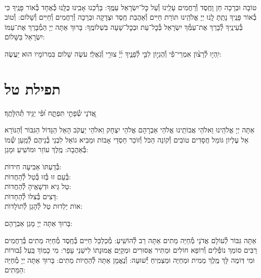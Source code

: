 \documentclass[twoside, openany, parskip=half, 11pt]{book}
\begin{document}
\shatz\\
טוֹבָה וּבְרָכָה חֵן וָחֶֽסֶד וְ֯רַחֲמִים עָלֵֽינוּ וְ֯עַל כׇּל־יִשְׂרָאֵל עַמֶּֽךָ: בָּרְ֯כֵנוּ אָבִֽינוּ כֻּלָּֽנוּ כְּ֯אֶחָד בְּ֯אוֹר פָּנֶֽיךָ כִּי בְ֯אוֹר פָּנֶֽיךָ נָתַֽתָּ לָֽנוּ יְיָ אֱלֹהֵֽינוּ תּוֹרַת חַיִּים וְ֯אַהֲבַת חֶֽסֶד וּצְדָקָה וּבְרָכָה וְ֯רַחֲמִים וְ֯חַיִּים וְ֯שָׁלוֹם: וְ֯טוֹב בְּ֯עֵינֶֽיךָ לְ֯בָרֵךְ אֶת־עַמְּ֯ךָ יִשְׂרָאֵל בְּ֯כׇל־עֵת וּבְכׇל־שָׁעָה בִּשְׁלוֹמֶֽךָ: בָּרוּךְ אַתָּה יְיָ הַמְ֯בָרֵךְ אֶת־עַמּוֹ יִשְׂרָאֵל בַּשָּׁלוֹם:

יִֽהְי֥וּ לְ֯רָצ֨וֹן אִמְרֵי־פִ֡י וְ֯הֶגְי֣וֹן לִבִּ֣י לְ֯פָנֶ֑יךָ יְ֜יָ֗ צוּרִ֥י וְ֯גֹֽאֲלִֽי׃ עֹשֶׂה שָׁלוֹם בִּמְרוֹמָיו הוּא יַעֲשֶׂה:

\vfill

\section[תפילת טל]{ תפילת טל }
\label{tefilastal}


\begin{small}
אֲ֭דֹנָי שְׂ֯פָתַ֣י תִּפְתָּ֑ח וּ֝פִ֗י יַגִּ֥יד תְּ֯הִלָּתֶֽךָ׃
\\
\end{small}
אַתָּה יְיָ אֱלֹהֵֽינוּ וֵאלֹהֵי אֲבוֹתֵֽינוּ אֱלֹהֵי אַבְרָהָם אֱלֹהֵי יִצְחָק וֵאלֹהֵי יַעֲקֹב הָאֵל הַגָּדוֹל הַגִּבּוֹר וְ֯הַנּוֹרָא אֵל עֶלְיוֹן גּוֹמֵל חֲסָדִים טוֹבִים וְ֯קוֹנֵה הַכֹּל וְ֯זוֹכֵר חַסְדֵי אָבוֹת וּמֵבִיא גוֹאֵל לִבְנֵי בְ֯נֵיהֶם לְ֯מַֽעַן שְׁ֯מוֹ בְּ֯אַהֲבָה: מֶֽלֶךְ עוֹזֵר וּמוֹשִֽׁיעַ וּמָגֵן:


\begin{large}
בְּ֯דַעְתּוׂ אַבִּיעָה חִידוׂת: \\
בְּ֯עַם זוּ בְּ֯זוּ בְּ֯טַל לְ֯הַחֲדוׂת:\\
טַל גֵּיא וּדְשָׁאֶֽיהָ לְ֯הַחֲדוׂת: \\
דָּצִים בְּ֯צִלּוׂ לְ֯הֵחָדוׂת:\\
אוׂת יַלְדוּת טַל לְ֯הָגֵן לְ֯תוׂלָדוׂת:

\end{large}


בָּרוּךְ אַתָּה יְיָ מָגֵן אַבְרָהָם:

אַתָּה גִּבּוֹר לְ֯עוֹלָם אֲדֹנָי מְ֯חַיֵּה מֵתִים אַתָּה רַב לְ֯הוֹשִֽׁיעַ: מְ֯כַלְכֵּל חַיִּים בְּ֯חֶֽסֶד מְ֯חַיֵּה מֵתִים בְּ֯רַחֲמִים רַבִּים סוֹמֵךְ נוֹפְ֯לִים וְ֯רוֹפֵא חוֹלִים וּמַתִּיר אֲסוּרִים וּמְקַיֵּם אֱמוּנָתוֹ לִישֵׁנֵי עָפָר: מִי כָמֽוֹךָ בַּֽעַל גְּ֯בוּרוֹת וּמִי דּֽוֹמֶה לָּךְ מֶֽלֶךְ מֵמִית וּמְחַיֶּה וּמַצְמִֽיחַ יְ֯שׁוּעָה: וְ֯נֶאֱמָן אַתָּה לְ֯הַחֲיוֹת מֵתִים: בָּרוּךְ אַתָּה יְיָ מְ֯חַיֵּה הַמֵּתִים:
\end{document}
